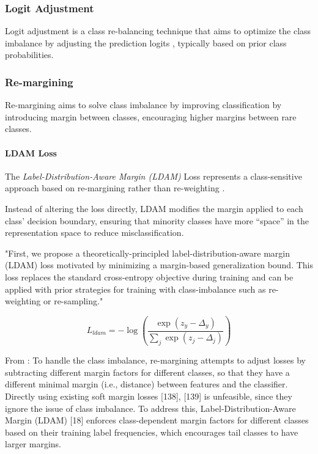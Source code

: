 \subsubsection{Logit Adjustment}
Logit adjustment is a class re-balancing technique that aims to optimize the class imbalance by adjusting the prediction logits \cite{menon2021longtaillearninglogitadjustment}, typically based on prior class probabilities. 

\subsubsection{Re-margining}
Re-margining aims to solve class imbalance by improving classification by introducing margin between classes, encouraging higher margins between rare classes.

\paragraph{LDAM Loss}
The \emph{Label-Distribution-Aware Margin (LDAM)} Loss represents a class-sensitive approach based on re-margining rather than re-weighting \cite{cao2019learningimbalanceddatasetslabeldistributionaware}. 

Instead of altering the loss directly, LDAM modifies the margin applied to each class’ decision boundary, ensuring that minority classes have more “space” in the representation space to reduce misclassification.

"First, we propose a theoretically-principled label-distribution-aware margin (LDAM) loss motivated by minimizing a margin-based generalization bound. This loss replaces the standard cross-entropy objective during training and can be applied with prior strategies for training with class-imbalance such as re-weighting or re-sampling." 

\begin{equation}
    L_{ldam} = - \log\left( \frac{\exp(z_y - \Delta_y)}{\sum_j \exp(z_j - \Delta_j)} \right)
\end{equation}

From \cite{zhang2023deep}: To handle the class imbalance, re-margining
attempts to adjust losses by subtracting different margin factors for
different classes, so that they have a different minimal margin (i.e.,
distance) between features and the classifier. Directly using existing
soft margin losses [138], [139] is unfeasible, since they ignore the
issue of class imbalance. To address this, Label-Distribution-Aware
Margin (LDAM) [18] enforces class-dependent margin factors for
different classes based on their training label frequencies, which
encourages tail classes to have larger margins.


